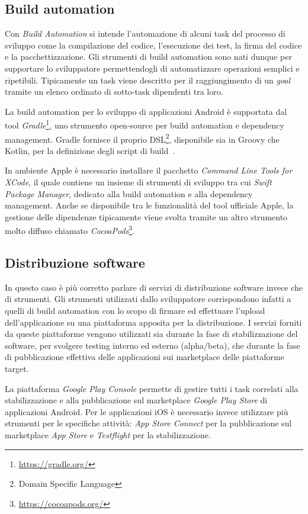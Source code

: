 \subsection*{Build automation}
Con \textit{Build Automation} si intende l'automazione di alcuni task del processo di sviluppo come la compilazione del codice, 
l'esecuzione dei test, 
la firma del codice e la pacchettizzazione. 
Gli strumenti di build automation sono nati dunque per supportare lo sviluppatore permettendogli di automatizzare operazioni semplici e ripetibili. 
Tipicamente un task viene descritto per il raggiungimento di un \textit{goal} tramite un elenco ordinato di sotto-task dipendenti tra loro.

La build automation per lo sviluppo di applicazioni Android è supportata dal tool \textit{Gradle}\footnote{\href{https://gradle.org/}{https://gradle.org/}}, 
uno strumento open-source per build automation e dependency management. 
Gradle fornisce il proprio DSL\footnote{Domain Specific Language}, 
disponibile sia in Groovy che Kotlin, 
per la definizione degli script di build~\cite{nagy2022simplifying}.

In ambiente Apple è necessario installare il pacchetto \textit{Command Line Tools for XCode}, il quale contiene un insieme di strumenti di sviluppo tra cui \textit{Swift Package Manager}, dedicato alla build automation e alla dependency management. Anche se disponibile tra le funzionalità del tool ufficiale Apple, la gestione delle dipendenze tipicamente viene svolta tramite un altro strumento molto diffuso chiamato \textit{CocoaPods}\footnote{\href{https://cocoapods.org/}{https://cocoapods.org/}}.

\subsection*{Distribuzione software}
In questo caso è più corretto parlare di servizi di distribuzione software invece che di strumenti. 
Gli strumenti utilizzati dallo sviluppatore corrispondono infatti a quelli di build automation con lo scopo di firmare ed effettuare l'upload dell'applicazione su una piattaforma apposita per la distribuzione. 
I servizi forniti da queste piattaforme vengono utilizzati sia durante la fase di stabilizzazione del software, 
per svolgere testing interno ed esterno (alpha/beta), 
che durante la fase di pubblicazione effettiva delle applicazioni sui marketplace delle piattaforme target.

La piattaforma \textit{Google Play Console} permette di gestire tutti i task correlati alla stabilizzazione e alla pubblicazione sul marketplace \textit{Google Play Store} di applicazioni Android. 
Per le applicazioni iOS è necessario invece utilizzare più strumenti per le specifiche attività: 
\textit{App Store Connect} per la pubblicazione sul marketplace \textit{App Store} e \textit{Testflight} per la stabilizzazione.

